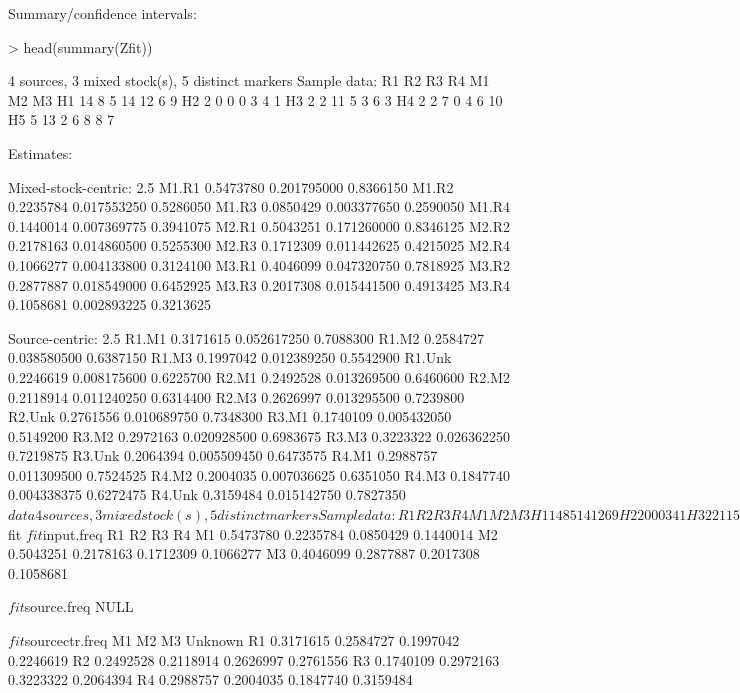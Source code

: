 \documentclass[11pt]{article}
\begin{document}
Summary/confidence intervals:
\begin{Schunk}
\begin{Sinput}
> head(summary(Zfit))
\end{Sinput}
\begin{Soutput}
4 sources, 3 mixed stock(s), 5 distinct markers
Sample data:
   R1 R2 R3 R4 M1 M2 M3
H1 14  8  5 14 12  6  9
H2  2  0  0  0  3  4  1
H3  2  2 11  5  3  6  3
H4  2  2  7  0  4  6 10
H5  5 13  2  6  8  8  7

Estimates:

Mixed-stock-centric:
                       2.5%
M1.R1 0.5473780 0.201795000 0.8366150
M1.R2 0.2235784 0.017553250 0.5286050
M1.R3 0.0850429 0.003377650 0.2590050
M1.R4 0.1440014 0.007369775 0.3941075
M2.R1 0.5043251 0.171260000 0.8346125
M2.R2 0.2178163 0.014860500 0.5255300
M2.R3 0.1712309 0.011442625 0.4215025
M2.R4 0.1066277 0.004133800 0.3124100
M3.R1 0.4046099 0.047320750 0.7818925
M3.R2 0.2877887 0.018549000 0.6452925
M3.R3 0.2017308 0.015441500 0.4913425
M3.R4 0.1058681 0.002893225 0.3213625

Source-centric:
                        2.5%
R1.M1  0.3171615 0.052617250 0.7088300
R1.M2  0.2584727 0.038580500 0.6387150
R1.M3  0.1997042 0.012389250 0.5542900
R1.Unk 0.2246619 0.008175600 0.6225700
R2.M1  0.2492528 0.013269500 0.6460600
R2.M2  0.2118914 0.011240250 0.6314400
R2.M3  0.2626997 0.013295500 0.7239800
R2.Unk 0.2761556 0.010689750 0.7348300
R3.M1  0.1740109 0.005432050 0.5149200
R3.M2  0.2972163 0.020928500 0.6983675
R3.M3  0.3223322 0.026362250 0.7219875
R3.Unk 0.2064394 0.005509450 0.6473575
R4.M1  0.2988757 0.011309500 0.7524525
R4.M2  0.2004035 0.007036625 0.6351050
R4.M3  0.1847740 0.004338375 0.6272475
R4.Unk 0.3159484 0.015142750 0.7827350
$data
4 sources, 3 mixed stock(s), 5 distinct markers
Sample data:
   R1 R2 R3 R4 M1 M2 M3
H1 14  8  5 14 12  6  9
H2  2  0  0  0  3  4  1
H3  2  2 11  5  3  6  3
H4  2  2  7  0  4  6 10
H5  5 13  2  6  8  8  7

$fit
$fit$input.freq
          R1        R2        R3        R4
M1 0.5473780 0.2235784 0.0850429 0.1440014
M2 0.5043251 0.2178163 0.1712309 0.1066277
M3 0.4046099 0.2877887 0.2017308 0.1058681

$fit$source.freq
NULL

$fit$sourcectr.freq
          M1        M2        M3   Unknown
R1 0.3171615 0.2584727 0.1997042 0.2246619
R2 0.2492528 0.2118914 0.2626997 0.2761556
R3 0.1740109 0.2972163 0.3223322 0.2064394
R4 0.2988757 0.2004035 0.1847740 0.3159484



\end{Soutput}
\end{Schunk}
\end{document}
